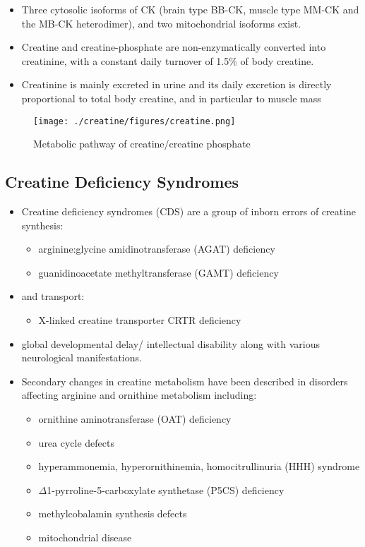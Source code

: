 \documentclass{scrartcl}
\begin{document}
\begin{itemize}
\item Three cytosolic isoforms of CK (brain type BB-CK, muscle type MM-CK
and the MB-CK heterodimer), and two mitochondrial isoforms exist.

\item Creatine and creatine-phosphate are non-enzymatically converted into
creatinine, with a constant daily turnover of 1.5\% of body
creatine.

\item Creatinine is mainly excreted in urine and its daily excretion is
directly proportional to total body creatine, and in particular to
muscle mass
\end{itemize}

\begin{figure}[htbp]
\centering
\texttt{[image: ./creatine/figures/creatine.png]}
\caption{\label{fig:orged8171d}
Metabolic pathway of creatine/creatine phosphate}
\end{figure}


\subsection{Creatine Deficiency Syndromes}
\label{sec:org7c9222e}
\begin{itemize}
\item Creatine deficiency syndromes (CDS) are a group of inborn errors of
creatine synthesis:
\begin{itemize}
\item arginine:glycine amidinotransferase (AGAT) deficiency
\item guanidinoacetate methyltransferase (GAMT) deficiency
\end{itemize}
\item and transport:
\begin{itemize}
\item X-linked creatine transporter CRTR deficiency
\end{itemize}
\item global developmental delay/ intellectual disability along with
various neurological manifestations.

\item Secondary changes in creatine metabolism have been described in
disorders affecting arginine and ornithine metabolism including:
\begin{itemize}
\item ornithine aminotransferase (OAT) deficiency
\item urea cycle defects
\item hyperammonemia, hyperornithinemia, homocitrullinuria (HHH) syndrome
\item \(\Delta\)1-pyrroline-5-carboxylate synthetase (P5CS) deficiency
\item methylcobalamin synthesis defects
\item mitochondrial disease
\end{itemize}
\end{itemize}
\end{document}
